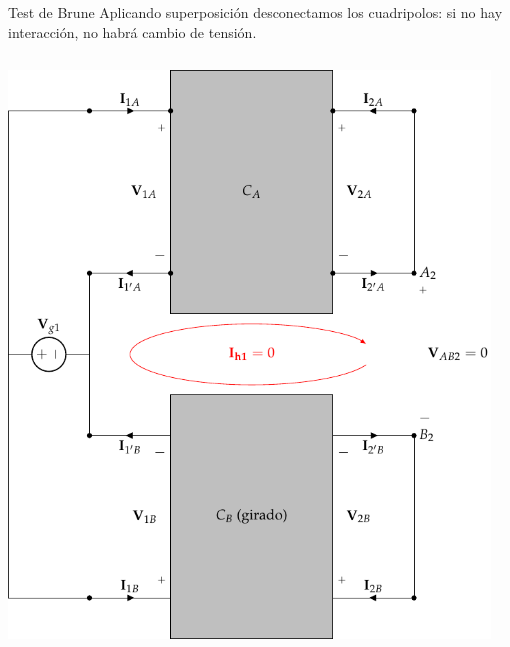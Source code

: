 \documentclass[aspectratio=169, usenames,svgnames,dvipsnames]{beamer}
\begin{document}
\begin{frame}[label={sec:orgd8e5d9e},plain]{Test de Brune}
Aplicando superposición desconectamos los cuadripolos: \alert{si no hay interacción, no habrá cambio de tensión}.
\begin{columns}
\begin{column}{0.5\columnwidth}
\begin{center}
\includegraphics[height=0.8\textheight]{../figs/paralelo-paralelo-brune-entrada.pdf}
\end{center}
\end{column}
\begin{column}{0.5\columnwidth}
\begin{center}

\end{center}
\end{column}
\end{columns}
\end{frame}
\end{document}
